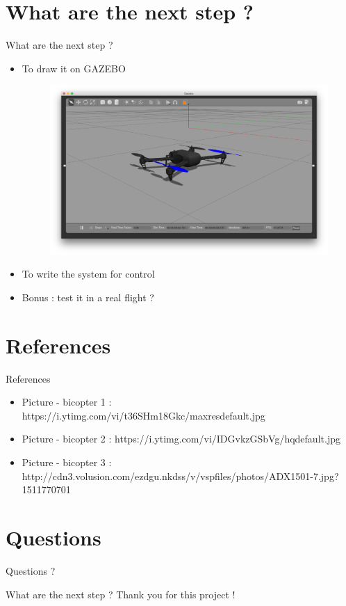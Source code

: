 \documentclass{beamer}
\begin{document}
\section{What are the next step ?}
\begin{frame}{What are the next step ?}
\begin{itemize}
\item To draw it on GAZEBO
\begin{figure}
\includegraphics[scale=0.1]{pictures/gazebo}
\end{figure}
\item To write the system for control
\item Bonus : test it in a real flight ?
\end{itemize}
\end{frame}

\section{References}
\begin{frame}{References}
\begin{itemize}
\item Picture - bicopter 1 : https://i.ytimg.com/vi/t36SHm18Gkc/maxresdefault.jpg
\item Picture - bicopter 2 : https://i.ytimg.com/vi/IDGvkzGSbVg/hqdefault.jpg
\item Picture - bicopter 3 : http://cdn3.volusion.com/ezdgu.nkdss/v/vspfiles/photos/ADX1501-7.jpg?1511770701
\end{itemize}
\end{frame}

\section{Questions}
\begin{frame}{}
\huge{Questions ?}
\end{frame}

\begin{frame}{What are the next step ?}
\huge{Thank you for this project !}
\end{frame}
\end{document}
